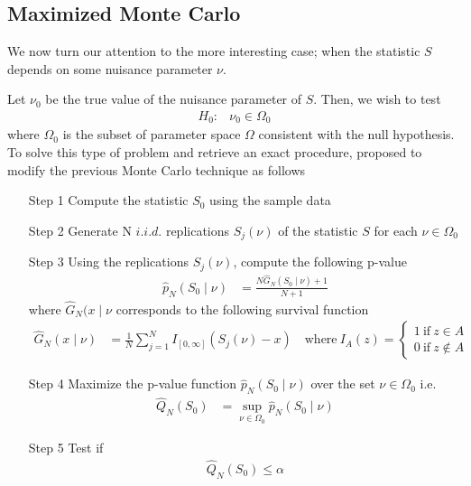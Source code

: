 \documentclass[11pt]{article}\usepackage[]{graphicx}\usepackage[]{color}
\begin{document}
\subsection{Maximized Monte Carlo}

We now turn our attention to the more interesting case; when the statistic $S$ depends on some nuisance parameter $\nu$.

Let $\nu_0$ be the true value of the nuisance parameter of $S$. Then, we wish to test
\begin{align}
H_0 : & \nu_0 \in \Omega_0
\end{align}
where $\Omega_0$ is the subset of parameter space $\Omega$ consistent with the null hypothesis. To solve this type of problem and retrieve an exact procedure, \citet{dufour_monte_2006} proposed to modify the previous Monte Carlo technique as follows
\begin{itemize}
\item[Step 1] Compute the statistic $S_0$ using the sample data
\item[Step 2]  Generate N $i.i.d.$ replications $S_{j}(\nu)$ of the statistic $S$ for each $\nu \in \Omega_0$
\item[Step 3]  Using the replications $S_{j}(\nu)$, compute the following p-value
\begin{align}
\hat{p}_{N}(S_{0} \mid \nu) & = \frac{N\hat{G}_{N}(S_{0} \mid \nu)+1}{N+1}
\end{align}
where $\hat{G}_{N}(x \mid \nu$ corresponds to the following survival function
\begin{align}
\hat{G}_{N}(x \mid \nu) & =\frac{1}{N}\sum_{j=1}^{N}I_{[0,\infty]}(S_{j}(\nu)-x) \quad \mathrm{where} \ I_{A}(z)=\left\{\begin{array}{l}
1\ \mathrm{if}\ z\in A\\
0\ \mathrm{if}\ z\not\in A
\end{array}\right.
\end{align}

\item[Step 4] Maximize the p-value function $\hat{p}_{N}(S_{0} \mid \nu)$ over the set $\nu \in \Omega_0$ i.e.
\begin{align}
\hat{Q}_N(S_0) & = \sup_{\nu \in \Omega_0} \hat{p}_{N}(S_{0} \mid \nu)
\end{align}

\item[Step 5] Test if
\begin{align}
\hat{Q}_{N}(S_{0})\leq \alpha
\end{align}
\end{itemize}
\end{document}
